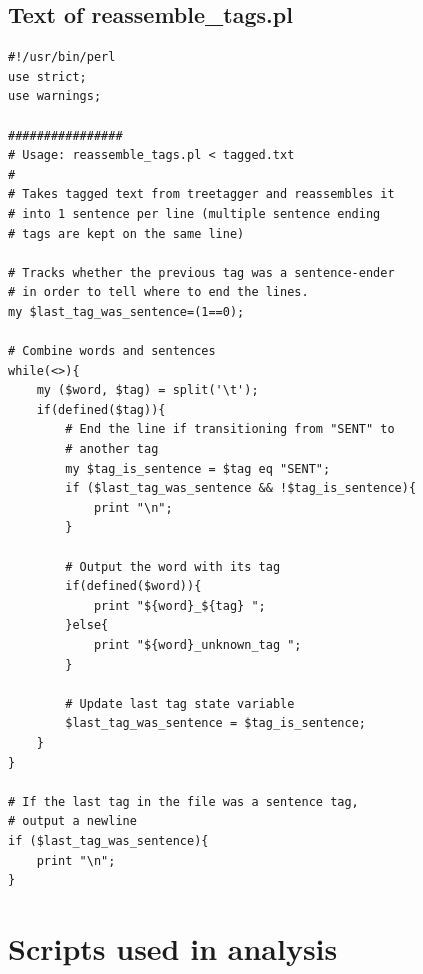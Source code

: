 \documentclass[10pt,letterpaper]{book}
\begin{document}
\section{Text of reassemble\_tags.pl}
\label{app:reassembletags}
\lstset{language=Perl}
\begin{lstlisting}
#!/usr/bin/perl
use strict;
use warnings;

################
# Usage: reassemble_tags.pl < tagged.txt
#
# Takes tagged text from treetagger and reassembles it
# into 1 sentence per line (multiple sentence ending
# tags are kept on the same line)

# Tracks whether the previous tag was a sentence-ender
# in order to tell where to end the lines.
my $last_tag_was_sentence=(1==0);

# Combine words and sentences
while(<>){
    my ($word, $tag) = split('\t');
    if(defined($tag)){
        # End the line if transitioning from "SENT" to
        # another tag
        my $tag_is_sentence = $tag eq "SENT";
        if ($last_tag_was_sentence && !$tag_is_sentence){
            print "\n";
        }

        # Output the word with its tag
        if(defined($word)){
            print "${word}_${tag} ";
        }else{
            print "${word}_unknown_tag ";
        }

        # Update last tag state variable
        $last_tag_was_sentence = $tag_is_sentence;
    }
}

# If the last tag in the file was a sentence tag,
# output a newline
if ($last_tag_was_sentence){
    print "\n";
}
\end{lstlisting}

\chapter{Scripts used in analysis}
\end{document}
